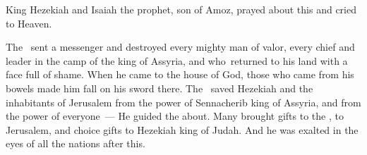 \begin{inparaenum}
   King Hezekiah and Isaiah the prophet, son of Amoz, prayed about this and cried to Heaven.%

   The \lord\ sent a messenger and destroyed every mighty man of valor, every chief and leader in the camp of the king of Assyria, and who\understood{}\ returned to his land with a face full of shame. When he came to the house of God, those who came from his bowels made him fall on his sword there.%
   The \lord\ saved Hezekiah and the inhabitants of Jerusalem from the power of Sennacherib king of Assyria, and from the power of everyone~--- He guided the about.%
   Many brought gifts to the \lord, to Jerusalem, and choice gifts to Hezekiah king of Judah. And he was exalted in the eyes of all the nations after this.%


\end{inparaenum}
